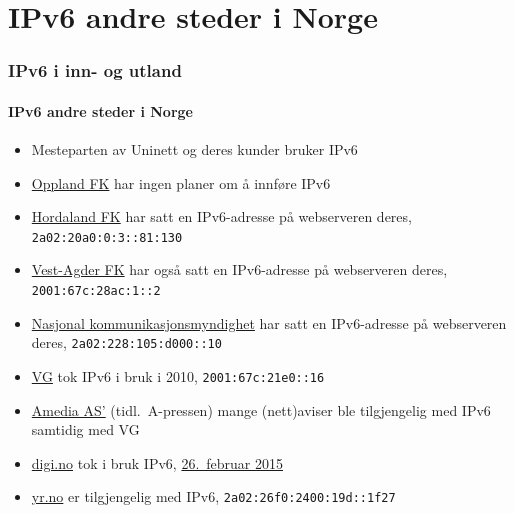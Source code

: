 \section{IPv6 andre steder i Norge}
\begin{frame}
  \frametitle{IPv6 i inn- og utland}
  \framesubtitle{IPv6 andre steder i Norge}
  \begin{itemize}
  \item Mesteparten av Uninett og deres kunder bruker IPv6
  \item \href{http://www.oppland.no/}{Oppland FK} har ingen
    planer om å innføre IPv6
  \item \href{http://www.hordaland.no/}{Hordaland FK} har satt en
    IPv6-adresse på webserveren deres, \texttt{2a02:20a0:0:3::81:130}
  \item \href{http://www.vaf.no/}{Vest-Agder FK} har også satt en
    IPv6-adresse på webserveren deres, \texttt{2001:67c:28ac:1::2}
  \item \href{http://www.nkom.no/}{Nasjonal kommunikasjonsmyndighet}
    har satt en IPv6-adresse på webserveren deres,
    \texttt{2a02:228:105:d000::10}
  \item \href{http://vg.no/}{VG} tok IPv6 i bruk i 2010,
    \texttt{2001:67c:21e0::16}
  \item \href{http://www.amedia.no/}{Amedia AS'} (tidl.\ A-pressen) mange
    (nett)aviser ble tilgjengelig med IPv6 samtidig med VG
  \item \href{http://www.digi.no/}{digi.no} tok i bruk IPv6,
    \href{https://twitter.com/digi_no/status/567348983237206016}{26.~februar
      2015}
  \item \href{http://yr.no/}{yr.no} er tilgjengelig med IPv6,
    \texttt{2a02:26f0:2400:19d::1f27}
  \end{itemize}
\end{frame}

